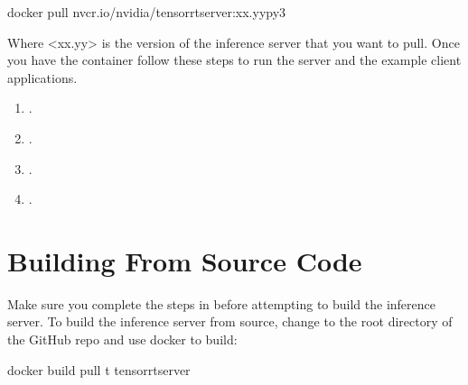 \documentclass[letterpaper,10pt,english]{sphinxmanual}
\begin{document}
\begin{sphinxVerbatim}[commandchars=\\\{\}]
\PYGZdl{} docker pull nvcr.io/nvidia/tensorrtserver:\PYGZlt{}xx.yy\PYGZgt{}\PYGZhy{}py3
\end{sphinxVerbatim}

Where \textless{}xx.yy\textgreater{} is the version of the inference server that you want to
pull. Once you have the container follow these steps to run the server
and the example client applications.
\begin{enumerate}
\def\theenumi{\arabic{enumi}}
\def\labelenumi{\theenumi .}
\makeatletter\def\p@enumii{\p@enumi \theenumi .}\makeatother
\item {} 
{\hyperref[\detokenize{quickstart:section-run-tensorrt-inference-server}]{}}.

\item {} 
{\hyperref[\detokenize{quickstart:section-verify-inference-server-status}]{}}.

\item {} 
{\hyperref[\detokenize{quickstart:section-building-the-client-examples}]{}}.

\item {} 
{\hyperref[\detokenize{quickstart:section-running-the-image-classification-example}]{}}.

\end{enumerate}


\section{Building From Source Code}
\label{\detokenize{quickstart:building-from-source-code}}\label{\detokenize{quickstart:section-building-from-source-code}}
Make sure you complete the steps in {\hyperref[\detokenize{quickstart:section-prerequisites}]{}}
before attempting to build the inference server. To build the
inference server from source, change to the root directory of the
GitHub repo and use docker to build:

\begin{sphinxVerbatim}[commandchars=\\\{\}]
\PYGZdl{} docker build \PYGZhy{}\PYGZhy{}pull \PYGZhy{}t tensorrtserver
\end{sphinxVerbatim}
\end{document}
